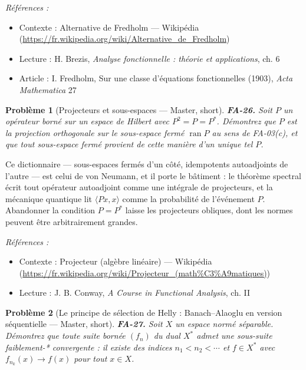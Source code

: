 \documentclass[11pt]{article}
\newtheorem{problem}{Problème}
\newenvironment{refs}{\par\small\noindent\emph{Références :}\begin{itemize}\setlength\itemsep{0pt}}{\end{itemize}\normalsize}
\begin{document}
\begin{refs}
\item Contexte : Alternative de Fredholm --- Wikipédia (\url{https://fr.wikipedia.org/wiki/Alternative_de_Fredholm})
\item Lecture : H. Brezis, \textit{Analyse fonctionnelle : théorie et applications}, ch. 6
\item Article : I. Fredholm, \og{} Sur une classe d'équations fonctionnelles \fg{} (1903), \textit{Acta Mathematica} 27
\end{refs}

\bigskip

\begin{problem}[{Projecteurs et sous-espaces --- Master, short}]
\textbf{FA-26.} Soit $ P $ un opérateur borné sur un espace de Hilbert avec
$ P^2 = P = P^{*} $. Démontrez que $ P $ est la projection orthogonale sur le sous-espace fermé
$ \operatorname{ran} P $ au sens de FA-03(c), et que tout sous-espace fermé provient de cette manière
d'un unique tel $ P $.
\end{problem}

\noindent Ce dictionnaire --- sous-espaces fermés d'un côté, idempotents autoadjoints de l'autre ---
est celui de von Neumann, et il porte le bâtiment : le théorème spectral écrit tout opérateur autoadjoint
comme une intégrale de projecteurs, et la mécanique quantique lit $ \langle Px, x\rangle $ comme la
probabilité de l'événement $ P $. Abandonner la condition $ P = P^{*} $ laisse les projecteurs
obliques, dont les normes peuvent être arbitrairement grandes.

\begin{refs}
\item Contexte : Projecteur (algèbre linéaire) --- Wikipédia (\url{https://fr.wikipedia.org/wiki/Projecteur_(math%C3%A9matiques)})
\item Lecture : J. B. Conway, \textit{A Course in Functional Analysis}, ch. II
\end{refs}

\bigskip

\begin{problem}[{Le principe de sélection de Helly : Banach--Alaoglu en version séquentielle --- Master, short}]
\textbf{FA-27.} Soit $ X $ un espace normé séparable. Démontrez que toute suite
bornée $ (f_n) $ du dual $ X^{*} $ admet une sous-suite faiblement-* convergente : il existe des
indices $ n_1 < n_2 < \cdots $ et $ f \in X^{*} $ avec $ f_{n_k}(x) \to f(x) $ pour tout
$ x \in X $.
\end{problem}
\end{document}
